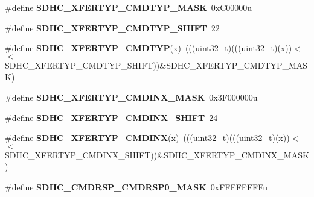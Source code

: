 \begin{DoxyCompactItemize}
\item 
\#define {\bfseries S\+D\+H\+C\+\_\+\+X\+F\+E\+R\+T\+Y\+P\+\_\+\+C\+M\+D\+T\+Y\+P\+\_\+\+M\+A\+SK}~0x\+C00000u\hypertarget{group__SDHC__Register__Masks_gad4ea839bc838b6f865a31a7348910355}{}\label{group__SDHC__Register__Masks_gad4ea839bc838b6f865a31a7348910355}

\item 
\#define {\bfseries S\+D\+H\+C\+\_\+\+X\+F\+E\+R\+T\+Y\+P\+\_\+\+C\+M\+D\+T\+Y\+P\+\_\+\+S\+H\+I\+FT}~22\hypertarget{group__SDHC__Register__Masks_ga69a977a39e49c356bb10ec98ca77abdd}{}\label{group__SDHC__Register__Masks_ga69a977a39e49c356bb10ec98ca77abdd}

\item 
\#define {\bfseries S\+D\+H\+C\+\_\+\+X\+F\+E\+R\+T\+Y\+P\+\_\+\+C\+M\+D\+T\+YP}(x)~(((uint32\+\_\+t)(((uint32\+\_\+t)(x))$<$$<$S\+D\+H\+C\+\_\+\+X\+F\+E\+R\+T\+Y\+P\+\_\+\+C\+M\+D\+T\+Y\+P\+\_\+\+S\+H\+I\+FT))\&S\+D\+H\+C\+\_\+\+X\+F\+E\+R\+T\+Y\+P\+\_\+\+C\+M\+D\+T\+Y\+P\+\_\+\+M\+A\+SK)\hypertarget{group__SDHC__Register__Masks_ga15fa4ebd2c7d71184d2a734ae1ba37fa}{}\label{group__SDHC__Register__Masks_ga15fa4ebd2c7d71184d2a734ae1ba37fa}

\item 
\#define {\bfseries S\+D\+H\+C\+\_\+\+X\+F\+E\+R\+T\+Y\+P\+\_\+\+C\+M\+D\+I\+N\+X\+\_\+\+M\+A\+SK}~0x3\+F000000u\hypertarget{group__SDHC__Register__Masks_ga38c578078fbe7eae9b211d4e75eb9dd0}{}\label{group__SDHC__Register__Masks_ga38c578078fbe7eae9b211d4e75eb9dd0}

\item 
\#define {\bfseries S\+D\+H\+C\+\_\+\+X\+F\+E\+R\+T\+Y\+P\+\_\+\+C\+M\+D\+I\+N\+X\+\_\+\+S\+H\+I\+FT}~24\hypertarget{group__SDHC__Register__Masks_ga3ff92ff3a2de4c2006862e08e92198a2}{}\label{group__SDHC__Register__Masks_ga3ff92ff3a2de4c2006862e08e92198a2}

\item 
\#define {\bfseries S\+D\+H\+C\+\_\+\+X\+F\+E\+R\+T\+Y\+P\+\_\+\+C\+M\+D\+I\+NX}(x)~(((uint32\+\_\+t)(((uint32\+\_\+t)(x))$<$$<$S\+D\+H\+C\+\_\+\+X\+F\+E\+R\+T\+Y\+P\+\_\+\+C\+M\+D\+I\+N\+X\+\_\+\+S\+H\+I\+FT))\&S\+D\+H\+C\+\_\+\+X\+F\+E\+R\+T\+Y\+P\+\_\+\+C\+M\+D\+I\+N\+X\+\_\+\+M\+A\+SK)\hypertarget{group__SDHC__Register__Masks_ga14109a758d3ca3014df09696919ba77a}{}\label{group__SDHC__Register__Masks_ga14109a758d3ca3014df09696919ba77a}

\item 
\#define {\bfseries S\+D\+H\+C\+\_\+\+C\+M\+D\+R\+S\+P\+\_\+\+C\+M\+D\+R\+S\+P0\+\_\+\+M\+A\+SK}~0x\+F\+F\+F\+F\+F\+F\+F\+Fu\hypertarget{group__SDHC__Register__Masks_ga0e18ea51c0f8c567b8c7f0c8daed3a3f}{}\label{group__SDHC__Register__Masks_ga0e18ea51c0f8c567b8c7f0c8daed3a3f}


\end{DoxyCompactItemize}
